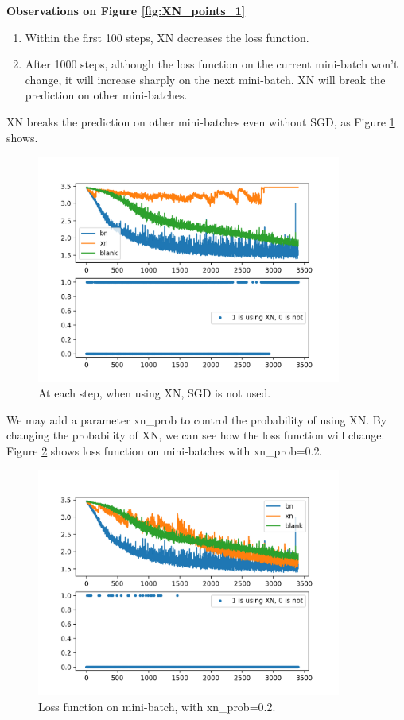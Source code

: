 \textbf{Observations on Figure \ref{fig:XN_points_1}} 
\begin{enumerate}
	\item Within the first 100 steps, XN decreases the loss function.
	\item After 1000 steps, although the loss function on the current mini-batch won't change, it will increase sharply on the next mini-batch. XN will break the prediction on other mini-batches.
\end{enumerate}

XN breaks the prediction on other mini-batches even without SGD, as Figure \ref{fig:XN_points_onlyXN} shows.
\begin{figure}[H]
	\center
	\includegraphics*[width=10cm]{./figures/XN_points_onlyXN.png}
	\caption{At each step, when using XN, SGD is not used.}
	\label{fig:XN_points_onlyXN}
\end{figure}


We may add a parameter xn\_prob to control the probability of using XN. By changing the probability of XN, we can see how the loss function will change. Figure \ref{fig:XN_points_02} shows loss function on mini-batches with xn\_prob=0.2.

\begin{figure}[H]
	\center
	\includegraphics*[width=10cm]{./figures/XN_Points_02.png}
	\caption{Loss function on mini-batch, with xn\_prob=0.2.}
	\label{fig:XN_points_02}
\end{figure}

